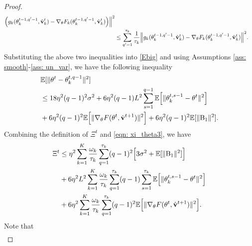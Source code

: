 \documentclass[twoside,journal]{IEEEtran}
\def\VectorFont{\bf}
\newcommand{\vv}{{\VectorFont v}}
\begin{document}
\begin{proof}
\begin{align*}
\Big(g_k(\theta_k^{t-1,q^\prime-1}, \hat \vv_k^{t})-
\nabla_{\theta} F_k(\theta_k^{t-1,q^\prime-1}, \hat \vv_k^{t})\Big)\Big\|^2\\
&\leq\sum_{q^\prime=1}^{\tau_k}\frac{1}{\tau_k}\Big\|
g_k(\theta_k^{t-1,q^\prime-1}, \hat \vv_k^{t})-
\nabla_{\theta} F_k(\theta_k^{t-1,q^\prime-1}, \hat \vv_k^{t})\Big\|^2.
\end{align*}
Substituting the above two inequalities into \eqref{Ebig} and using Assumptions \ref{ass: smooth}-\ref{ass: un_var},  we have the following inequality
\begin{align}
\label{eqn: xi_theta3}
\nonumber&\mathbb{E}[\|\theta^t-\theta_k^{t,q-1}\|^2]\\
\nonumber &\leq 18\eta^2(q-1)^2\sigma^2+
6\eta^2(q-1)L^2\sum_{s=1}^{q-1}\mathbb{E}\Big[\|
\theta_k^{t,s-1}-
\theta^{t}\|^2\Big]\\
&
+6\eta^2(q-1)^2\mathbb{E}\Big[\|
\nabla_{\theta}F(\theta^{t},\hat{\vv}^{t+1})
\|^2\Big] +6\eta^2(q-1)^2\mathbb{E}[\|\textmd{B}_1\|^2].
\end{align}
Combining the definition of $\Xi^t$ and \eqref{eqn: xi_theta3}, we have
\begin{align}\label{eqn: xi_theta3_sum}
\nonumber\Xi^t&\leq \eta^2\sum_{k=1}^K\frac{\omega_k}{\tau_k}\sum_{q=1}^{\tau_k}(q-1)^2
\Big[3\sigma^2+\mathbb{E}[\|\textmd{B}_1\|^2]\Big]\\
\nonumber&+
6\eta^2L^2\sum_{k=1}^K\frac{\omega_k}{\tau_k}\sum_{q=1}^{\tau_k}
(q-1)\sum_{s=1}^{\tau_k}\mathbb{E}\Big[\|
\theta_k^{t,s-1}-
\theta^{t}\|^2\Big]\\
&+6\eta^2\sum_{k=1}^K\frac{\omega_k}{\tau_k}\sum_{q=1}^{\tau_k}(q-1)^2
\mathbb{E}\Big[\|
\nabla_{\theta}F(\theta^{t},\hat{\vv}^{t+1})
\|^2\Big].
\end{align}
Note that
\begin{align*}

\end{align*}
\end{proof}
\end{document}
